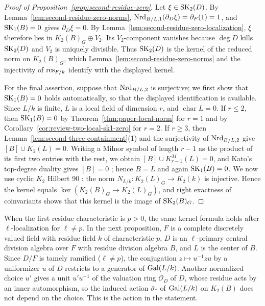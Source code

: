 \begin{proof}[Proof of Proposition~\ref{prop:second-residue-zero}]
Let $\xi\in\operatorname{SK}_2(D)$.
By Lemma~\ref{lem:second-residue-zero-norms}, $\operatorname{Nrd}_{B/L,1}(\partial_D\xi)=\partial_F(1)=1$, and $\operatorname{SK}_1(B)=0$ gives $\partial_D\xi=0$.
By Lemma~\ref{lem:second-residue-zero-localization}, $\xi$ therefore lies in $K_2(B)_G\oplus V_2$.
Its $V_2$-component vanishes because $\deg D$ kills $\operatorname{SK}_2(D)$ and $V_2$ is uniquely divisible.
Thus $\operatorname{SK}_2(D)$ is the kernel of the reduced norm on $K_2(B)_G$, which Lemma~\ref{lem:second-residue-zero-norms} and the injectivity of $\operatorname{res}_{F/k}$ identify with the displayed kernel.

For the final assertion, suppose that $\operatorname{Nrd}_{B/L,2}$ is surjective; we first show that $\operatorname{SK}_1(B)=0$ holds automatically, so that the displayed identification is available.
Since $L/k$ is finite, $L$ is a local field of dimension $r$, and $\operatorname{char}L=0$.
If $r\le2$, then $\operatorname{SK}_1(B)=0$ by Theorem~\ref{thm:paper-local-norm} for $r=1$ and by Corollary~\ref{cor:review-two-local-sk1-zero} for $r=2$.
If $r\ge3$, then Lemma~\ref{lem:second-three-containment}(1) and the surjectivity of $\operatorname{Nrd}_{B/L,2}$ give $[B]\cup K_2(L)=0$.
Writing a Milnor symbol of length $r-1$ as the product of its first two entries with the rest, we obtain $[B]\cup K_{r-1}^M(L)=0$, and Kato's top-degree duality gives $[B]=0$ \cite[Theorem 2]{KatoExistence}; hence $B=L$ and again $\operatorname{SK}_1(B)=0$.
We now use cyclic $K_2$ Hilbert 90 \cite[Theorem 14.1]{MerkurjevSuslin1982}: the norm $N_{L/k}\colon K_2(L)_G\to K_2(k)$ is injective.
Hence the kernel equals $\ker(K_2(B)_G\to K_2(L)_G)$, and right exactness of coinvariants shows that this kernel is the image of $\operatorname{SK}_2(B)_G$.
\end{proof}

When the first residue characteristic is $p>0$, the same kernel formula holds after $\ell$-localization for $\ell\ne p$.
In the next proposition, $F$ is a complete discretely valued field with residue field $k$ of characteristic $p$, $D$ is an $\ell$-primary central division algebra over $F$ with residue division algebra $B$, and $L$ is the center of $B$.
Since $D/F$ is tamely ramified ($\ell\ne p$), the conjugation $z\mapsto u^{-1}zu$ by a uniformizer $u$ of $D$ restricts to a generator of $\operatorname{Gal}(L/k)$.
Another normalized choice $u'$ gives a unit $u'u^{-1}$ of the valuation ring $\mathcal O_D$ of $D$, whose residue acts by an inner automorphism, so the induced action $\bar\sigma_*$ of $\operatorname{Gal}(L/k)$ on $K_2(B)$ does not depend on the choice.
This is the action in the statement.

